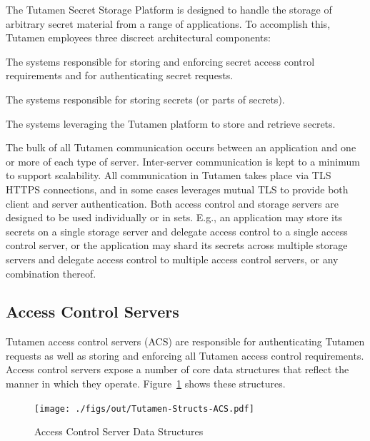 The Tutamen Secret Storage Platform is designed to handle the storage
of arbitrary secret material from a range of applications. To
accomplish this, Tutamen employees three discreet architectural
components:

\begin{packed_desc}
\item[Access Control Servers (ACS):] The systems responsible for
  storing and enforcing secret access control requirements and for
  authenticating secret requests.
\item[Storage Servers (SS):] The systems responsible for storing
  secrets (or parts of secrets).
\item[Applications:] The systems leveraging the Tutamen platform to
  store and retrieve secrets.
\end{packed_desc}

The bulk of all Tutamen communication occurs between an application
and one or more of each type of server. Inter-server communication is
kept to a minimum to support scalability. All communication in Tutamen
takes place via TLS~\cite{dierks2008} HTTPS connections, and in some
cases leverages mutual TLS to provide both client and server
authentication. Both access control and storage servers are designed
to be used individually or in sets. E.g., an application may store its
secrets on a single storage server and delegate access control to a
single access control server, or the application may shard its secrets
across multiple storage servers and delegate access control to
multiple access control servers, or any combination thereof.

\subsection{Access Control Servers}
\label{chap:tutamen:arch:acs}

Tutamen access control servers (ACS) are responsible for
authenticating Tutamen requests as well as storing and enforcing all
Tutamen access control requirements. Access control servers expose a
number of core data structures that reflect the manner in which they
operate. Figure~\ref{fig:tutamen:acstructs} shows these structures.

\begin{figure}[t]
  \centering
  \texttt{[image: ./figs/out/Tutamen-Structs-ACS.pdf]}
  \caption{Access Control Server Data Structures}
  \label{fig:tutamen:acstructs}
\end{figure}

